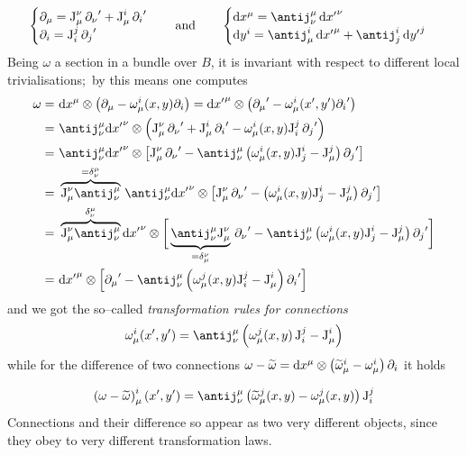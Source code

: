 $$\begin{cases}
    \der_\mu=\J^\nu_\mu\,{\der_\nu}'+\J^i_\mu\,{\der_i}'\\
    \der_i=\J^j_i\,{\der_j}'
\end{cases}\quad\text{and}\qquad\begin{cases}
    \d x^\mu=\antij^\mu_\nu\,\d{x'}^\nu\\
    \d y^i=\antij^i_\mu\,\d{x'}^\mu+\antij^i_j\,\d{y'}^j
\end{cases}$$
Being $\omega$ a section in a bundle over $B$, it is invariant with respect to different local trivialisations;\, by this means one computes 
\begin{align*}
    \omega= &\,\,\d x^\mu\otimes\left(\der_\mu-\omega^i_\mu(x,y)\der_i\right)=\d{x'}^\mu\otimes\left({\der_\mu}'-\omega^i_\mu(x',y'){\der_i}'\right)\\
    =&\,\,\antij^\mu_\nu\d{x'}^\nu\otimes\left(\J^\nu_\mu\,{\der_\nu}'+\J^i_\mu\,{\der_i}'-\omega^i_\mu(x,y)\J^j_i\,{\der_j}'\right)\\
    = &\,\,\antij^\mu_\nu\d{x'}^\nu\otimes\left[\J^\nu_\mu\,{\der_\nu}'-\antij^\mu_\nu\left(\omega^i_\mu(x,y)\J^i_j-\J^j_\mu\right){\der_j}'\right]\\
    =&\,\,\overbrace{\J^\nu_\mu\antij^\mu_\nu}^{=\delta^\mu_\nu}\,\antij^\mu_\nu\d{x'}^\nu\otimes\left[\J^\nu_\mu\,{\der_\nu}'-\left(\omega^i_\mu(x,y)\J^i_j-\J^j_\mu\right){\der_j}'\right]\\
    =&\,\,\overbrace{\J^\nu_\mu\antij^\mu_\nu}^{\delta^\mu_\nu}\d{x'}^\nu\otimes\bigg[\underbrace{\antij^\mu_\nu\J^\nu_\mu}_{=\delta^\nu_\mu}\,{\der_\nu}'-\antij^\mu_\nu\left(\omega^i_\mu(x,y)\J^i_j-\J^j_\mu\right){\der_j}'\bigg]\\
    =&\,\,\d{x'}^\mu\otimes\left[{\der_\mu}'-\antij^\mu_\nu\left(\omega^j_\mu(x,y)\J^j_i-\J^i_\mu\right){\der_i}' \right]
\end{align*}
and we got the so--called \emph{transformation rules for connections}
\begin{equation}\label{conn_transf}
\omega^i_\mu(x',y')=\antij^\mu_\nu\left(\omega^j_\mu(x,y)\,\J^j_i-\J^i_\mu\right)
\end{equation}
while for the difference of two connections $\omega-\widetilde{\omega}=\text{\normalfont d} x^\mu\otimes\left(\widetilde{\omega}^i_\mu-\omega^i_\mu\right)\partial_i$ it holds

\begin{equation}\label{conn_tensor}
    \left(\omega-\widetilde{\omega}\right)^i_\mu(x',y')=\antij^\mu_\nu\left(\widetilde{\omega}^j_\mu(x,y)-\omega^j_\mu(x,y)\right)\J^j_i
\end{equation}
Connections and their difference so appear as two very different objects, since they obey to very different transformation laws.

